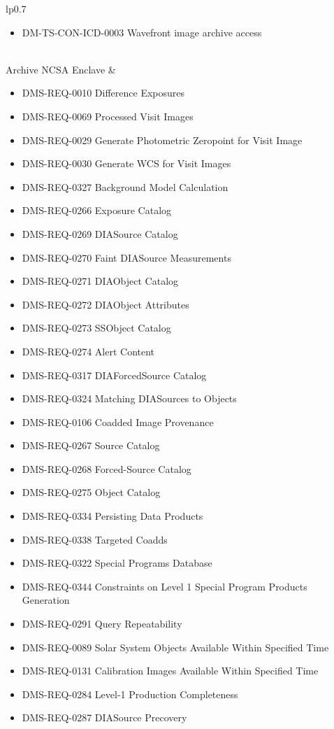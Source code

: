 \begin{xtabular}{lp{0.7\textwidth}}
\begin{itemize}
\item DM-TS-CON-ICD-0003 Wavefront image archive access
\end{itemize} \\ \hline
Archive NCSA Enclave &
\begin{itemize}DMS-REQ-0004 Nightly Data Accessible Within 24 hrs
\item DMS-REQ-0010 Difference Exposures
\item DMS-REQ-0069 Processed Visit Images
\item DMS-REQ-0029 Generate Photometric Zeropoint for Visit Image
\item DMS-REQ-0030 Generate WCS for Visit Images
\item DMS-REQ-0327 Background Model Calculation
\item DMS-REQ-0266 Exposure Catalog
\item DMS-REQ-0269 DIASource Catalog
\item DMS-REQ-0270 Faint DIASource Measurements
\item DMS-REQ-0271 DIAObject Catalog
\item DMS-REQ-0272 DIAObject Attributes
\item DMS-REQ-0273 SSObject Catalog
\item DMS-REQ-0274 Alert Content
\item DMS-REQ-0317 DIAForcedSource Catalog
\item DMS-REQ-0324 Matching DIASources to Objects
\item DMS-REQ-0106 Coadded Image Provenance
\item DMS-REQ-0267 Source Catalog
\item DMS-REQ-0268 Forced-Source Catalog
\item DMS-REQ-0275 Object Catalog
\item DMS-REQ-0334 Persisting Data Products
\item DMS-REQ-0338 Targeted Coadds
\item DMS-REQ-0322 Special Programs Database
\item DMS-REQ-0344 Constraints on Level 1 Special Program Products Generation
\item DMS-REQ-0291 Query Repeatability
\item DMS-REQ-0089 Solar System Objects Available Within Specified Time
\item DMS-REQ-0131 Calibration Images Available Within Specified Time
\item DMS-REQ-0284 Level-1 Production Completeness
\item DMS-REQ-0287 DIASource Precovery

\end{itemize}
\end{xtabular}
